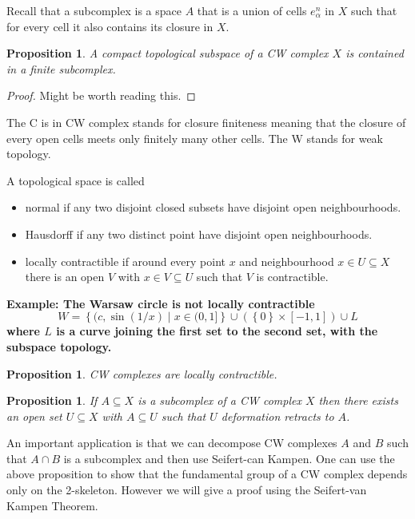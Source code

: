 \documentclass[11pt]{article}
\newcommand{\relmiddle}[1]{\mathrel{}\middle#1\mathrel{}}
\newcommand{\rmv}{\relmiddle|}
\newenvironment{defin}
	{\begin{mdframed}[backgroundcolor=white, roundcorner=5pt, linewidth=1pt]
		\setlength{\parindent}{0pt}
		}
	{\end{mdframed}}
\newcommand{\mdf}[1]{{\color{red} #1}}
\newenvironment{eg}
{\begin{mdframed}[backgroundcolor=mylg,roundcorner=5pt,linewidth=0pt]\setlength{\parindent}{0pt}\bfseries{Example:}\normalfont}
	{\end{mdframed}}
\newtheorem{prop}[theorem]{Proposition}
\begin{document}
Recall that a \mdf{subcomplex} is a space $A$ that is a union of cells $e_\alpha^n$ in $X$ such that for every cell it also contains its closure in $X$.
\begin{prop}
A compact topological subspace of a CW complex $X$ is contained in a finite subcomplex.
\end{prop}
\begin{proof}
Might be worth reading this.
\end{proof}
\begin{defin}
The C is in CW complex stands for \mdf{closure finiteness} meaning that the closure of every open cells meets only finitely many other cells.
The W stands for weak topology.

A topological space is called
\begin{itemize}
	\item \mdf{normal} if any two disjoint closed subsets have disjoint open neighbourhoods.
	\item \mdf{Hausdorff} if any two distinct point have disjoint open neighbourhoods.
	\item \mdf{locally contractible} if around every point $x$ and neighbourhood $x\in U \subseteq X$ there is an open $V$ with $x\in V \subseteq U $ such that $V$ is contractible.
\end{itemize}
\end{defin}

\begin{eg}
The Warsaw circle is not locally contractible
\[
	W=\left\{(c, \sin(1/x) \rmv x \in (0, 1] \right\}\cup \left(\left\{0\right\}\times [-1, 1]\right)\cup L
\]
where $L$ is a curve joining the first set to the second set, with the subspace topology.
\end{eg}

\begin{prop}
CW complexes are locally contractible.
\end{prop}

\begin{prop}
\label{prop:subdr}
If $A\subseteq X$ is a subcomplex of a CW complex $X$ then there exists an open set $U\subseteq X$  with $A\subseteq U$ such that $U$ deformation retracts to $A$.
\end{prop}

An important application is that we can decompose CW complexes $A$ and $B$ such that $A\cap B$ is a subcomplex and then use Seifert-can Kampen.
One can use the above proposition to show that the fundamental group of a CW complex depends only on the 2-skeleton.
However we will give a proof using the Seifert-van Kampen Theorem.
\end{document}
